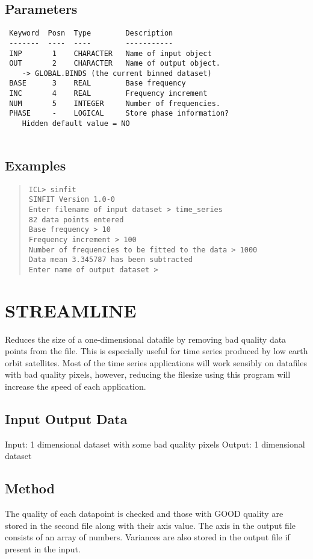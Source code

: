 \documentclass{book}
\renewcommand{\_}{{\tt\char'137}}     %
\begin{document}
\subsection{Parameters}
\begin{verbatim}
 Keyword  Posn  Type        Description
 -------  ----  ----        -----------
 INP       1    CHARACTER   Name of input object
 OUT       2    CHARACTER   Name of output object.
    -> GLOBAL.BINDS (the current binned dataset)
 BASE      3    REAL        Base frequency
 INC       4    REAL        Frequency increment
 NUM       5    INTEGER     Number of frequencies.
 PHASE     -    LOGICAL     Store phase information?
    Hidden default value = NO
 
\end{verbatim}\subsection{Examples}
\begin{quote}\begin{verbatim}
ICL> sinfit
SINFIT Version 1.0-0
Enter filename of input dataset > time_series
82 data points entered
Base frequency > 10
Frequency increment > 100
Number of frequencies to be fitted to the data > 1000
Data mean 3.345787 has been subtracted
Enter name of output dataset >
\end{verbatim}\end{quote}
\section{STREAMLINE}
Reduces the size of a one-dimensional datafile by removing
bad quality data points from the file. This is especially useful
for time series produced by low earth orbit satellites. Most
of the time series applications will work sensibly on datafiles with
bad quality pixels, however, reducing the filesize using this
program will increase the speed of each application.
 
\subsection{Input Output Data}
Input: 1 dimensional dataset with some bad quality pixels
Output: 1 dimensional dataset
\subsection{Method}
The quality of each datapoint is checked and those with GOOD
quality are stored in the second file along with their axis
value. The axis in the output file consists of an array of numbers.
Variances are also stored in the output file if present in the
input.
 
\end{document}
